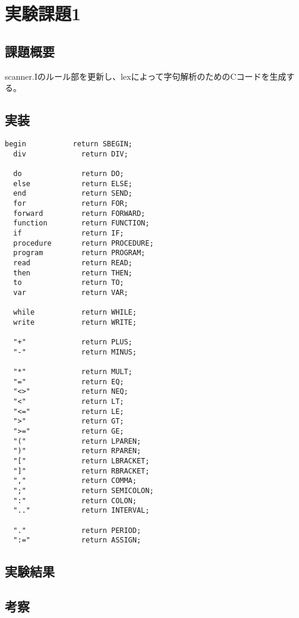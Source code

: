 \section{実験課題1}
\subsection{課題概要}
scanner.Iのルール部を更新し、lexによって字句解析のためのCコードを生成する。

\subsection{実装}
\begin{lstlisting}[caption={scanner.I(ルールの記述)},label={scanner.I(ルールの記述)}]
  begin           return SBEGIN;
  div             return DIV;
  
  do              return DO;
  else            return ELSE;
  end             return SEND;
  for             return FOR;
  forward         return FORWARD;
  function        return FUNCTION;
  if              return IF;
  procedure       return PROCEDURE;
  program         return PROGRAM;
  read            return READ;
  then            return THEN;
  to              return TO;
  var             return VAR;
  
  while           return WHILE;
  write           return WRITE;
  
  "+"             return PLUS;
  "-"             return MINUS;
  
  "*"             return MULT;
  "="             return EQ;
  "<>"            return NEQ;
  "<"             return LT;
  "<="            return LE;
  ">"             return GT;
  ">="            return GE;
  "("             return LPAREN;
  ")"             return RPAREN;
  "["             return LBRACKET;
  "]"             return RBRACKET;
  ","             return COMMA;
  ";"             return SEMICOLON;
  ":"             return COLON;
  ".."            return INTERVAL;
  
  "."             return PERIOD;
  ":="            return ASSIGN;
\end{lstlisting}

\subsection{実験結果}

\subsection{考察}
